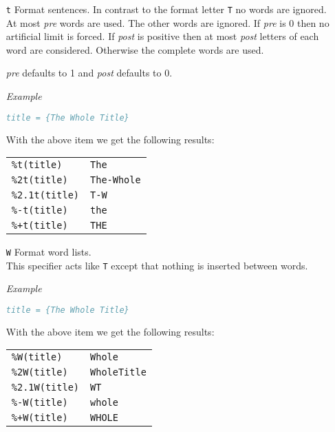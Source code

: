 \documentclass[11pt,a4paper]{scrbook}
\newenvironment{Example}{\smallskip\par\textit{Example}\par}{\smallskip\par}
\begin{document}
\begin{itemize}
  \item [\texttt{t}] Format sentences. In contrast to the
    format letter \texttt{T} no words are ignored.\\
    At most \textit{pre} words are used. The other words are ignored. If
    \textit{pre} is 0 then no artificial limit is forced. If \textit{post} is
    positive then at most \textit{post} letters of each word are considered.
    Otherwise the complete words are used.

    \textit{pre} defaults to 1 and \textit{post} defaults to 0.

    \begin{Example}
      \begin{lstlisting}[language=BibTeX]
  title = {The Whole Title}
      \end{lstlisting}\vspace{-2ex}
      With the above item we get the following results:

      \begin{tabular}{ll}
        \texttt{\%t(title)}	& \texttt{The}		\\
        \texttt{\%2t(title)}	& \texttt{The-Whole}	\\
        \texttt{\%2.1t(title)}	& \texttt{T-W}		\\
        \texttt{\%-t(title)}	& \texttt{the}		\\
        \texttt{\%+t(title)}	& \texttt{THE}
      \end{tabular}
    \end{Example}

  \item [\texttt{W}] Format word lists.\\
    This specifier acts like \texttt{T} except that nothing is inserted
    between words.

    \begin{Example}
      \begin{lstlisting}[language=BibTeX]
  title = {The Whole Title}
      \end{lstlisting}\vspace{-2ex}
      With the above item we get the following results:

      \begin{tabular}{ll}
        \texttt{\%W(title)}	& \texttt{Whole}		\\
        \texttt{\%2W(title)}	& \texttt{WholeTitle}		\\
        \texttt{\%2.1W(title)}	& \texttt{WT}			\\
        \texttt{\%-W(title)}	& \texttt{whole}		\\
        \texttt{\%+W(title)}	& \texttt{WHOLE}	
      \end{tabular}
    \end{Example}


\end{itemize}
\end{document}
